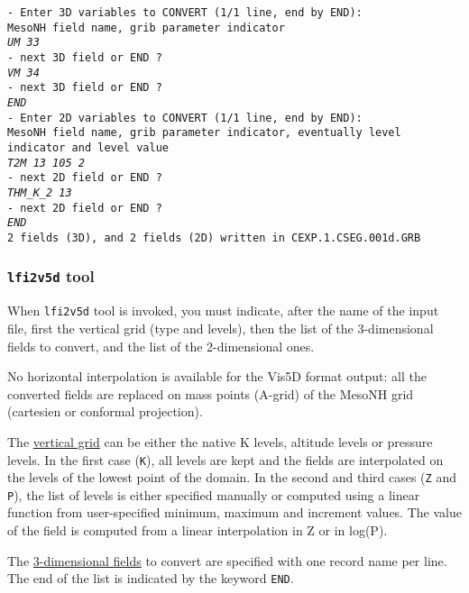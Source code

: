 {\tt - Enter 3D variables to CONVERT (1/1 line, end by END): }\\
{\tt  MesoNH field name, grib parameter indicator }\\
{\tt\it UM  33 }\\
{\tt - next 3D field or END ? }\\
{\tt\it VM  34 }\\
{\tt - next 3D field or END ? }\\
{\tt\it END }\\
{\tt - Enter 2D variables to CONVERT (1/1 line, end by END): }\\
{\tt  MesoNH field name, grib parameter indicator, eventually level indicator and level value}\\
{\tt\it T2M  13  105  2}\\
{\tt - next 2D field or END ? }\\
{\tt\it THM\_K\_2  13}\\
{\tt - next 2D field or END ? }\\
{\tt\it END}\\
{\tt 2 fields (3D), and   2 fields (2D) written in CEXP.1.CSEG.001d.GRB }\\
 
\normalsize
\subsubsection{{\tt lfi2v5d} tool}
When {\tt lfi2v5d} tool is invoked, you must indicate, 
after the name of the input file, first 
the vertical grid (type and levels), 
then the list of the 3-dimensional fields to convert, 
and the list of the 2-dimensional ones.

No horizontal interpolation is available for the Vis5D format output: all the
converted fields are replaced on mass points (A-grid) of the MesoNH grid
(cartesien or conformal projection).

The \underline{vertical grid} can be either the native K levels, altitude
levels or pressure levels. 
In the first case ({\tt K}), all levels are kept and the fields are interpolated
on the levels of the lowest point of the domain.
In the second and third cases ({\tt Z} and {\tt P}), the list of levels is
either specified
manually or computed using a linear function from user-specified
minimum, maximum and increment values. The value of the field is computed from
a linear interpolation in Z or in log(P).

The \underline{3-dimensional fields} to convert are specified with 
one record name per line.
The end of the list is indicated by the keyword {\tt END}.

